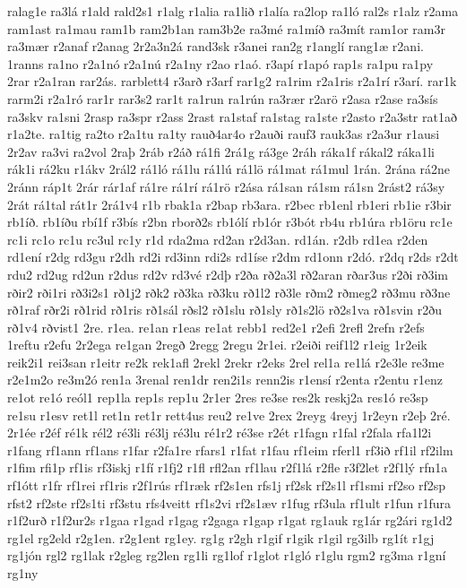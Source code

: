 {ralag1e
ra3lá
r1ald
rald2s1
r1alg
r1alia
ra1lið
r1alía
ra2lop
ra1ló
ral2s
r1alz
r2ama
ram1ast
ra1mau
ram1b
ram2b1an
ram3b2e
ra3mé
ra1míð
ra3mít
ram1or
ram3r
ra3mær
r2anaf
r2anag
2r2a3n2á
rand3sk
r3anei
ran2g
r1anglí
rang1æ
r2ani.
1ranns
ra1no
r2a1nó
r2a1nú
r2a1ny
r2ao
r1aó.
r3apí
r1apó
rap1s
ra1pu
ra1py
2rar
r2a1ran
rar2ás.
rarblett4
r3arð
r3arf
rar1g2
ra1rim
r2a1ris
r2a1rí
r3arí.
rar1k
rarm2i
r2a1ró
rar1r
rar3s2
rar1t
ra1run
ra1rún
ra3rær
r2arö
r2asa
r2ase
ra3sís
ra3skv
ra1sni
2rasp
ra3spr
r2ass
2rast
ra1staf
ra1stag
ra1ste
r2asto
r2a3str
rat1að
r1a2te.
ra1tig
ra2to
r2a1tu
ra1ty
rauð4ar4o
r2auði
rauf3
rauk3as
r2a3ur
r1ausi
2r2av
ra3vi
ra2vol
2raþ
2ráb
r2áð
rá1fi
2rá1g
rá3ge
2ráh
ráka1f
rákal2
ráka1li
rák1i
rá2ku
r1ákv
2rál2
rá1ló
rá1lu
rá1lú
rá1lö
rá1mat
rá1mul
1rán.
2rána
rá2ne
2ránn
ráp1t
2rár
rár1af
rá1re
rá1rí
rá1rö
r2ása
rá1san
rá1sm
rá1sn
2rást2
rá3sy
2rát
rá1tal
rát1r
2rá1v4
r1b
rbak1a
r2bap
rb3ara.
r2bec
rb1enl
rb1eri
rb1ie
r3bir
rb1íð.
rb1íðu
rbí1f
r3bís
r2bn
rborð2s
rb1ólí
rb1ór
r3bót
rb4u
rb1úra
rb1öru
rc1e
rc1i
rc1o
rc1u
rc3ul
rc1y
r1d
rda2ma
rd2an
r2d3an.
rd1án.
r2db
rd1ea
r2den
rd1ení
r2dg
rd3gu
r2dh
rd2i
rd3inn
rdi2s
rd1íse
r2dm
rd1onn
r2dó.
r2dq
r2ds
r2dt
rdu2
rd2ug
rd2un
r2dus
rd2v
rd3vé
r2dþ
r2ða
rð2a3l
rð2aran
rðar3us
r2ði
rð3im
rðir2
rði1ri
rð3i2s1
rð1j2
rðk2
rð3ka
rð3ku
rð1l2
rð3le
rðm2
rðmeg2
rð3mu
rð3ne
rð1raf
rðr2i
rð1rid
rð1ris
rð1sál
rðsl2
rð1slu
rð1sly
rð1s2lö
rð2s1va
rð1svin
r2ðu
rð1v4
rðvist1
2re.
r1ea.
re1an
r1eas
re1at
rebb1
red2e1
r2efi
2refl
2refn
r2efs
1reftu
r2efu
2r2ega
re1gan
2regð
2regg
2regu
2r1ei.
r2eiði
reif1l2
r1eig
1r2eik
reik2i1
rei3san
r1eitr
re2k
rek1afl
2rekl
2rekr
r2eks
2rel
rel1a
re1lá
r2e3le
re3me
r2e1m2o
re3m2ó
ren1a
3renal
ren1dr
ren2i1s
renn2is
r1ensí
r2enta
r2entu
r1enz
re1ot
re1ó
reól1
rep1la
rep1s
rep1u
2r1er
2res
re3se
res2k
reskj2a
res1ó
re3sp
re1su
r1esv
ret1l
ret1n
ret1r
rett4us
reu2
re1ve
2rex
2reyg
4reyj
1r2eyn
r2eþ
2ré.
2r1ée
r2éf
ré1k
rél2
ré3li
ré3lj
ré3lu
ré1r2
ré3se
r2ét
r1fagn
r1fal
r2fala
rfa1l2i
r1fang
rf1ann
rf1ans
r1far
r2fa1re
rfars1
r1fat
r1fau
rf1eim
rferl1
rf3ið
rf1il
rf2ilm
r1fim
rfi1p
rf1is
rf3iskj
r1fí
r1fj2
r1fl
rfl2an
rf1lau
r2f1lá
r2fle
r3f2let
r2f1lý
rfn1a
rf1ótt
r1fr
rf1rei
rf1ris
r2f1rús
rf1ræk
rf2s1en
rfs1j
rf2sk
rf2s1l
rf1smi
rf2so
rf2sp
rfst2
rf2ste
rf2s1ti
rf3stu
rfs4veitt
rf1s2vi
rf2s1æv
r1fug
rf3ula
rf1ult
r1fun
r1fura
r1f2urð
r1f2ur2s
r1gaa
r1gad
r1gag
r2gaga
r1gap
r1gat
rg1auk
rg1ár
rg2ári
rg1d2
rg1el
rg2eld
r2g1en.
r2g1ent
rg1ey.
rg1g
r2gh
r1gif
r1gik
r1gil
rg3ilb
rg1ít
r1gj
rg1jón
rgl2
rg1lak
r2gleg
rg2len
rg1li
rg1lof
r1glot
r1gló
r1glu
rgm2
rg3ma
r1gní
rg1ny
}
